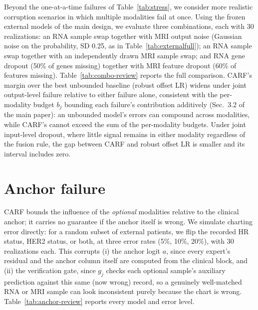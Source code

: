 \documentclass[a4paper,runningheads]{llncs}
\begin{document}
Beyond the one-at-a-time failures of Table~\ref{tab:stress}, we consider more realistic corruption scenarios in which multiple modalities fail at once. Using the frozen external models of the main design, we evaluate three combinations, each with 30 realizations: an RNA sample swap together with MRI output noise (Gaussian noise on the probability, SD 0.25, as in Table~\ref{tab:externalfull}); an RNA sample swap together with an independently drawn MRI sample swap; and RNA gene dropout (50\% of genes missing) together with MRI feature dropout (60\% of features missing). Table~\ref{tab:combo-review} reports the full comparison. CARF's margin over the best unbounded baseline (robust offset LR) widens under joint output-level failure relative to either failure alone, consistent with the per-modality budget $b_j$ bounding each failure's contribution additively (Sec.~3.2 of the main paper): an unbounded model's errors can compound across modalities, while CARF's cannot exceed the sum of the per-modality budgets. Under joint input-level dropout, where little signal remains in either modality regardless of the fusion rule, the gap between CARF and robust offset LR is smaller and its interval includes zero.

\begin{table}[h]
\centering
\caption{AUROC under simultaneous modality failures, external cohort (30 realizations each). R: RNA; M: MRI. Bold: best fusion model per row.}
\label{tab:combo-review}
\setlength{\tabcolsep}{3pt}
\end{table}

\section{Anchor failure}

CARF bounds the influence of the \emph{optional} modalities relative to the clinical anchor; it carries no guarantee if the anchor itself is wrong. We simulate charting error directly: for a random subset of external patients, we flip the recorded HR status, HER2 status, or both, at three error rates (5\%, 10\%, 20\%), with 30 realizations each. This corrupts (i) the anchor logit $a$, since every expert's residual and the anchor column itself are computed from the clinical block, and (ii) the verification gate, since $g_j$ checks each optional sample's auxiliary prediction against this same (now wrong) record, so a genuinely well-matched RNA or MRI sample can look inconsistent purely because the chart is wrong. Table~\ref{tab:anchor-review} reports every model and error level.
\end{document}
